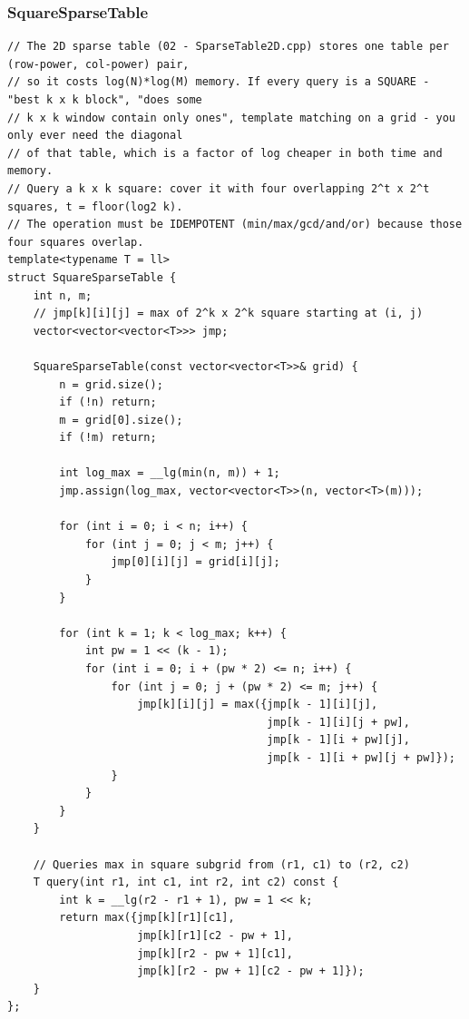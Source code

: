 \documentclass[9pt,a4paper,twocolumn]{extarticle}
\begin{document}
\subsubsection{SquareSparseTable}
\nopagebreak
\begin{lstlisting}
// The 2D sparse table (02 - SparseTable2D.cpp) stores one table per (row-power, col-power) pair,
// so it costs log(N)*log(M) memory. If every query is a SQUARE - "best k x k block", "does some
// k x k window contain only ones", template matching on a grid - you only ever need the diagonal
// of that table, which is a factor of log cheaper in both time and memory.
// Query a k x k square: cover it with four overlapping 2^t x 2^t squares, t = floor(log2 k).
// The operation must be IDEMPOTENT (min/max/gcd/and/or) because those four squares overlap.
template<typename T = ll>
struct SquareSparseTable {
    int n, m;
    // jmp[k][i][j] = max of 2^k x 2^k square starting at (i, j)
    vector<vector<vector<T>>> jmp;

    SquareSparseTable(const vector<vector<T>>& grid) {
        n = grid.size();
        if (!n) return;
        m = grid[0].size();
        if (!m) return;

        int log_max = __lg(min(n, m)) + 1;
        jmp.assign(log_max, vector<vector<T>>(n, vector<T>(m)));

        for (int i = 0; i < n; i++) {
            for (int j = 0; j < m; j++) {
                jmp[0][i][j] = grid[i][j];
            }
        }

        for (int k = 1; k < log_max; k++) {
            int pw = 1 << (k - 1);
            for (int i = 0; i + (pw * 2) <= n; i++) {
                for (int j = 0; j + (pw * 2) <= m; j++) {
                    jmp[k][i][j] = max({jmp[k - 1][i][j],
                                        jmp[k - 1][i][j + pw],
                                        jmp[k - 1][i + pw][j],
                                        jmp[k - 1][i + pw][j + pw]});
                }
            }
        }
    }

    // Queries max in square subgrid from (r1, c1) to (r2, c2)
    T query(int r1, int c1, int r2, int c2) const {
        int k = __lg(r2 - r1 + 1), pw = 1 << k;
        return max({jmp[k][r1][c1],
                    jmp[k][r1][c2 - pw + 1],
                    jmp[k][r2 - pw + 1][c1],
                    jmp[k][r2 - pw + 1][c2 - pw + 1]});
    }
};
\end{lstlisting}
\end{document}
